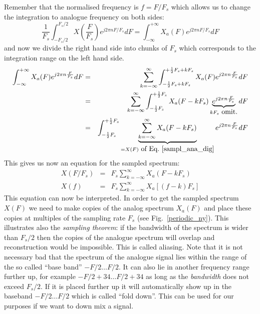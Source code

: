 \documentclass[12pt,a4paper]{article}
\begin{document}
Remember that the normalised frequency is $f=F/F_s$ which allows us
to change the integration to analogue frequency on both sides:
\begin{equation}
\frac{1}{F_s} \int_{-F_s/2}^{F_s/2} X(\frac{F}{F_s}) e^{j 2 \pi n F/F_s} dF
=
\int_{-\infty}^{+\infty} X_a(F) e^{j 2\pi n F/F_s} dF
\label{sampl_ana_dig}
\end{equation}
and now we divide the right hand side into chunks of $F_s$ which corresponds
to the integration range on the left hand side.
\begin{eqnarray}
\int_{-\infty}^{+\infty} X_a(F) e^{j 2\pi n \frac{F}{F_s}} dF
& = &
\sum_{k=-\infty}^{\infty} \int_{-\frac{1}{2} F_s + k F_s}^{+\frac{1}{2} F_s + k F_s} X_a(F) e^{j2\pi n \frac{F}{F_s}} dF \\
& = &
\sum_{k=-\infty}^{\infty} \int_{-\frac{1}{2} F_s}^{+\frac{1}{2} F_s} X_a(F-k F_s) \underbrace{e^{j2\pi n\frac{F}{F_s}}}_{k F_s \mbox{ omit.}} dF \\
& = &
\int_{-\frac{1}{2} F_s}^{+\frac{1}{2} F_s} \underbrace{\sum_{k=-\infty}^{\infty} X_a(F-k F_s)}_{=X(F) \mbox{ of Eq.~\ref{sampl_ana_dig}}} e^{j2\pi n\frac{F}{F_s}} dF
\end{eqnarray}
This gives us now an equation for the sampled spectrum:
\begin{eqnarray}
X(F/F_s) & = & F_s \sum_{k=-\infty}^{\infty} X_a(F-kF_s) \\
X(f) & = & F_s \sum_{k=-\infty}^{\infty} X_a[(f-k)F_s]
\end{eqnarray}
This equation can now be interpreted. In order to get the sampled
spectrum $X(F)$ we need to make copies of the analog spectrum
$X_a(F)$ and place these copies at multiples of the sampling rate
$F_s$ (see Fig.~\ref{periodic_ny}). This illustrates also the
\textsl{sampling theorem}: if the bandwidth of the spectrum is wider
than $F_s/2$ then the copies of the analogue spectrum will overlap and
reconstruction would be impossible. This is called aliasing. Note that
it is not necessary bad that the spectrum of the analogue signal lies
within the range of the so called ``base band'' $-F/2 \ldots F/2$. It
can also lie in another frequency range further up, for example $-F/2
+ 34 \ldots F/2 +34$ as long as the
\textsl{bandwidth} does not exceed $F_s/2$. If it is placed further up
it will automatically show up in the baseband $-F/2 \ldots F/2$ which
is called ``fold down''. This can be used for our purposes if we
want to down mix a signal.
\end{document}
